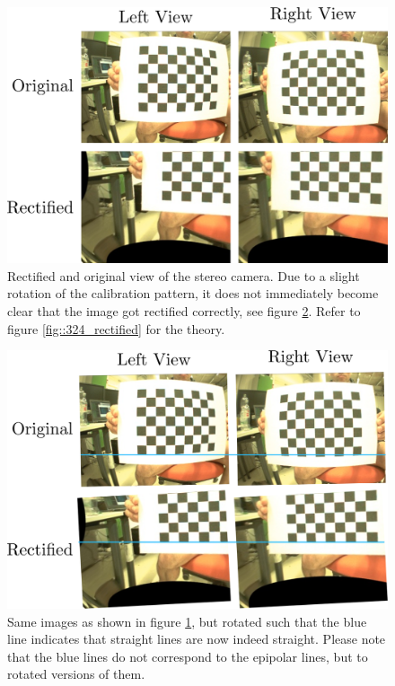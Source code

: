 \begin{figure}[h]
	\centering
	\includegraphics[scale=.28]{chapters/05_experiments/img/rect.png}
	\caption{Rectified and original view of the stereo camera. Due to a slight rotation of the calibration pattern, it does not immediately become clear that the image got rectified correctly, see figure \ref{fig::51_rect_line}. Refer to figure \ref{fig::324_rectified} for the theory.}
	\label{fig::51_rect}
\end{figure}

\begin{figure}[h]
	\centering
	\includegraphics[scale=.28]{chapters/05_experiments/img/rect_line.png}
	\caption{Same images as shown in figure \ref{fig::51_rect}, but rotated such that the blue line indicates that straight lines are now indeed straight. Please note that the blue lines do not correspond to the epipolar lines, but to rotated versions of them.}
	\label{fig::51_rect_line}
\end{figure}
